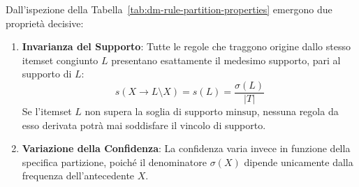 \begin{table}[H]
\centering
\small
\renewcommand{\arraystretch}{1.2}
\caption{Valutazione delle regole generate dalle partizioni binarie di $\{\text{Latte, Pannolini, Birra}\}$.}
\label{tab:dm-rule-partition-properties}
\end{table}

Dall'ispezione della Tabella~\ref{tab:dm-rule-partition-properties} emergono due proprietà decisive:
\begin{enumerate}
    \item \textbf{Invarianza del Supporto}: Tutte le regole che traggono origine dallo stesso itemset congiunto $L$ presentano esattamente il medesimo supporto, pari al supporto di $L$:
    \begin{equation}
    s(X \longrightarrow L \setminus X) = s(L) = \frac{\sigma(L)}{|T|}
    \end{equation}
    Se l'itemset $L$ non supera la soglia di supporto $\mathrm{minsup}$, nessuna regola da esso derivata potrà mai soddisfare il vincolo di supporto.
    \item \textbf{Variazione della Confidenza}: La confidenza varia invece in funzione della specifica partizione, poiché il denominatore $\sigma(X)$ dipende unicamente dalla frequenza dell'antecedente $X$.
\end{enumerate}

